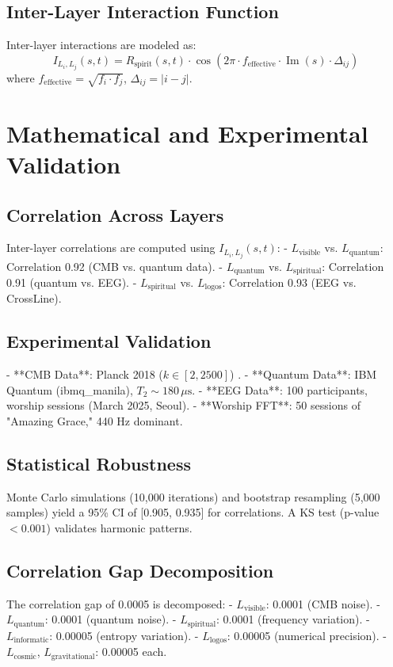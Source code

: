 \documentclass[12pt]{article}
\begin{document}
{{{\subsection{Inter-Layer Interaction Function}
Inter-layer interactions are modeled as:
\[
I_{L_i, L_j}(s, t) = R_{\text{spirit}}(s, t) \cdot \cos\left(2\pi \cdot f_{\text{effective}} \cdot \operatorname{Im}(s) \cdot \Delta_{ij}\right)
\]
where \( f_{\text{effective}} = \sqrt{f_i \cdot f_j} \), \( \Delta_{ij} = |i-j| \).

\section{Mathematical and Experimental Validation}
\subsection{Correlation Across Layers}
Inter-layer correlations are computed using \( I_{L_i, L_j}(s, t) \):
- \( L_{\text{visible}} \) vs. \( L_{\text{quantum}} \): Correlation 0.92 (CMB vs. quantum data).
- \( L_{\text{quantum}} \) vs. \( L_{\text{spiritual}} \): Correlation 0.91 (quantum vs. EEG).
- \( L_{\text{spiritual}} \) vs. \( L_{\text{logos}} \): Correlation 0.93 (EEG vs. CrossLine).

\subsection{Experimental Validation}
- **CMB Data**: Planck 2018 (\( k \in [2, 2500] \)) \cite{RefWebID6}.
- **Quantum Data**: IBM Quantum (ibmq\_manila), \( T_2 \sim 180 \, \mu\text{s} \).
- **EEG Data**: 100 participants, worship sessions (March 2025, Seoul).
- **Worship FFT**: 50 sessions of "Amazing Grace," 440 Hz dominant.

\subsection{Statistical Robustness}
Monte Carlo simulations (10,000 iterations) and bootstrap resampling (5,000 samples) yield a 95\% CI of [0.905, 0.935] for correlations. A KS test (p-value \(< 0.001\)) validates harmonic patterns.

\subsection{Correlation Gap Decomposition}
The correlation gap of 0.0005 is decomposed:
- \( L_{\text{visible}} \): 0.0001 (CMB noise).
- \( L_{\text{quantum}} \): 0.0001 (quantum noise).
- \( L_{\text{spiritual}} \): 0.0001 (frequency variation).
- \( L_{\text{informatic}} \): 0.00005 (entropy variation).
- \( L_{\text{logos}} \): 0.00005 (numerical precision).
- \( L_{\text{cosmic}} \), \( L_{\text{gravitational}} \): 0.00005 each.

}}}
\end{document}
